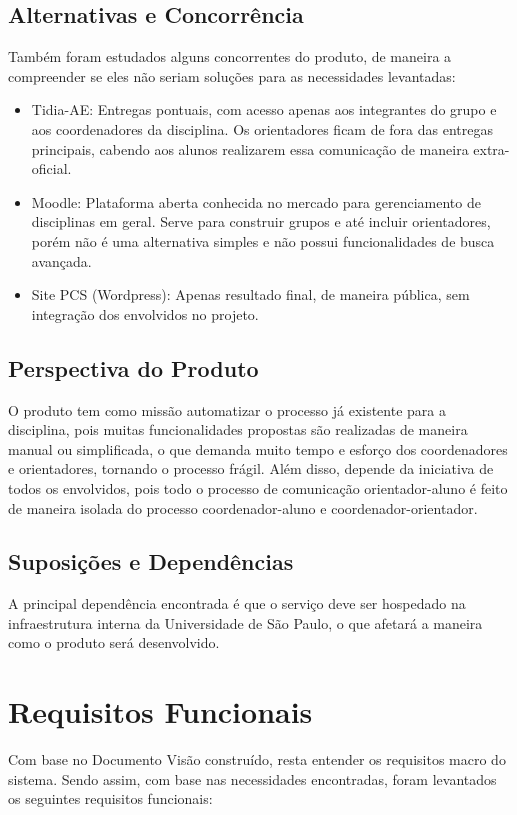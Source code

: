 \subsection{Alternativas e Concorrência}
Também foram estudados alguns concorrentes do produto, de maneira a compreender se eles não seriam soluções para as necessidades levantadas:

\begin{itemize}
    \item Tidia-AE: Entregas pontuais, com acesso apenas aos integrantes do grupo e aos coordenadores da disciplina. Os orientadores ficam de fora das entregas principais, cabendo aos alunos realizarem essa comunicação de maneira extra-oficial.
    \item Moodle: Plataforma aberta conhecida no mercado para gerenciamento de disciplinas em geral. Serve para construir grupos e até incluir orientadores, porém não é uma alternativa simples e não possui funcionalidades de busca avançada.
    \item Site PCS (Wordpress): Apenas resultado final, de maneira pública, sem integração dos envolvidos no projeto.
\end{itemize}

\subsection{Perspectiva do Produto}
O produto tem como missão automatizar o processo já existente para a disciplina, pois muitas funcionalidades propostas são realizadas de maneira manual ou simplificada, o que demanda muito tempo e esforço dos coordenadores e orientadores, tornando o processo frágil. Além disso, depende da iniciativa de todos os envolvidos, pois todo o processo de comunicação orientador-aluno é feito de maneira isolada do processo coordenador-aluno e coordenador-orientador.

\subsection{Suposições e Dependências}
A principal dependência encontrada é que o serviço deve ser hospedado na infraestrutura interna da Universidade de São Paulo, o que afetará a maneira como o produto será desenvolvido.
  
\section{Requisitos Funcionais}
Com base no Documento Visão construído, resta entender os requisitos macro do sistema. Sendo assim, com base nas necessidades encontradas, foram levantados os seguintes requisitos funcionais:

